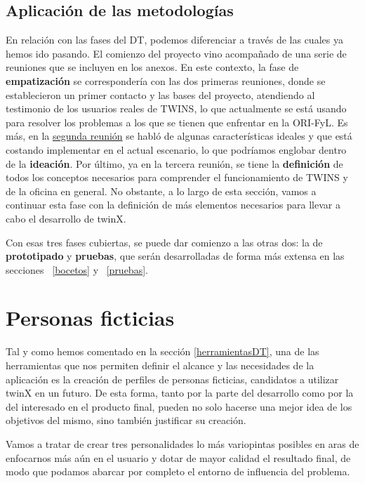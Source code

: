 \subsection{Aplicación de las metodologías}

En relación con las fases del DT, podemos diferenciar a través de las cuales ya hemos ido pasando. El comienzo del proyecto vino acompañado de una serie de reuniones que se incluyen en los anexos. En este contexto, la fase de \textbf{empatización} se correspondería con las dos primeras reuniones, donde se establecieron un primer contacto y las bases del proyecto, atendiendo al testimonio de los usuarios reales de TWINS, lo que actualmente se está usando para resolver los problemas a los que se tienen que enfrentar en la ORI-FyL. Es más, en la \hyperref[reunion2]{segunda reunión} se habló de algunas características ideales y que está costando implementar en el actual escenario, lo que podríamos englobar dentro de la \textbf{ideación}. Por último, ya en la tercera reunión, se tiene la \textbf{definición} de todos los conceptos necesarios para comprender el funcionamiento de TWINS y de la oficina en general. No obstante, a lo largo de esta sección, vamos a continuar esta fase con la definición de más elementos necesarios para llevar a cabo el desarrollo de twinX.

Con esas tres fases cubiertas, se puede dar comienzo a las otras dos: la de \textbf{prototipado} y \textbf{pruebas}, que serán desarrolladas de forma más extensa en las secciones ~\ref{bocetos} y ~\ref{pruebas}. %

\section{Personas ficticias}
\label{sec:personas}

Tal y como hemos comentado en la sección \ref{herramientasDT}, una de las herramientas que nos permiten definir el alcance y las necesidades de la aplicación es la creación de perfiles de personas ficticias, candidatos a utilizar twinX en un futuro. De esta forma, tanto por la parte del desarrollo como por la del interesado en el producto final, pueden no solo hacerse una mejor idea de los objetivos del mismo, sino también justificar su creación.

Vamos a tratar de crear tres personalidades lo más variopintas posibles en aras de enfocarnos más aún en el usuario y dotar de mayor calidad el resultado final, de modo que podamos abarcar por completo el entorno de influencia del problema.

